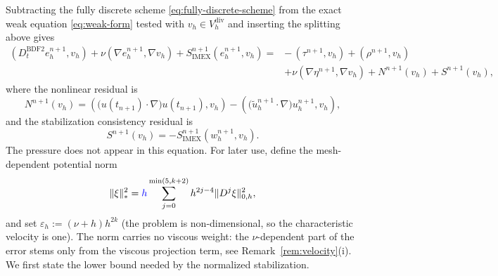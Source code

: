 \documentclass[11pt]{article}
\theoremstyle{remark}\newtheorem{remark}{Remark}
\newcommand{\Vh}{V_h}\newcommand{\Qh}{Q_h}
\newcommand{\Vdivh}{V_h^{\mathrm{div}}}
\newcommand{\Dt}{D_t^{\mathrm{BDF2}}}
\newcommand{\tu}{\tilde u_h}
\newcommand{\Simex}{S_{\mathrm{IMEX}}}
\theoremstyle{plain}
\newcommand{\new}[1]{{\color{blue}#1}}
\begin{document}
Subtracting the fully discrete scheme \eqref{eq:fully-discrete-scheme} from the exact weak equation \eqref{eq:weak-form} tested with $v_h\in\Vdivh$ and inserting the splitting above gives
\begin{equation}\label{eq:fully-discrete-error-equation}
\begin{aligned}
(\Dt e_h^{n+1},v_h)+\nu(\nabla e_h^{n+1},\nabla v_h)+\Simex^{n+1}(e_h^{n+1},v_h)
={}&-\,(\tau^{n+1},v_h)+(\rho^{n+1},v_h)\\
&+\nu(\nabla\eta^{n+1},\nabla v_h)+N^{n+1}(v_h)+S^{n+1}(v_h),
\end{aligned}
\end{equation}
where the nonlinear residual is
\[
    N^{n+1}(v_h)=\left(\big(u(t_{n+1})\cdot\nabla\big) u(t_{n+1}),v_h \right)-
\left(\big(\tu^{n+1}\cdot\nabla \big)u_h^{n+1},v_h \right),
\]
and the stabilization consistency residual is 
\[
    S^{n+1}(v_h)=-\Simex^{n+1}(w_h^{n+1},v_h).
\]
The pressure does not appear in this equation. 
For later use, define the mesh-dependent potential norm
\begin{equation}\label{eq:star-norm-definition}
\|\xi\|_*^2=\new{h}\sum_{j=0}^{\min(5,k+2)}h^{2j-4}\|D^j\xi\|_{0,h}^2,
\end{equation}
\new{and set $\varepsilon_h:=(\nu+h)h^{2k}$ (the problem is non-dimensional, so the characteristic velocity is one). The norm carries no viscous weight: the $\nu$-dependent part of the error stems only from the viscous projection term, see Remark~\ref{rem:velocity}(i).} We first state the lower bound needed by the normalized stabilization.
\end{document}
